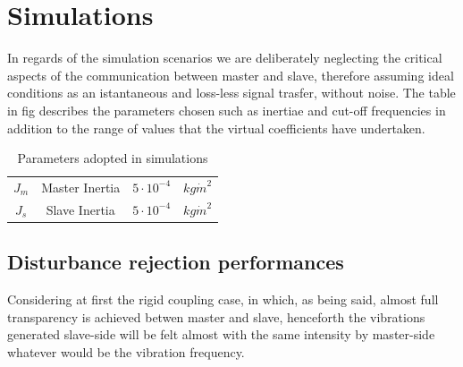 \section{Simulations}
In regards of the simulation scenarios we are deliberately neglecting the
critical aspects of the communication between master and slave, therefore
assuming ideal conditions as an istantaneous and loss-less signal trasfer,
without noise.
The table in fig describes the parameters chosen such as inertiae and
cut-off frequencies in addition to the range of values that the virtual
coefficients have undertaken.
\begin{table}[H]
\centering
	\begin{tabular}{c c c c}
		\toprule
		$J_{m}$  & Master Inertia & $5\cdot 10^{-4}$ & $kg\dot m^{2}$ \\
		$J_{s}$  & Slave Inertia & $5\cdot 10^{-4}$ & $kg\dot m^{2}$ \\
		\bottomrule
	\end{tabular}
	\caption{Parameters adopted in simulations}
	\label{simParams}
\end{table}

\newpage

\subsection{Disturbance rejection performances}

Considering at first the rigid coupling case, in which, as being said, almost
full transparency is achieved betwen master and slave, henceforth the vibrations
generated slave-side will be felt almost with the same intensity by master-side whatever would
be the vibration frequency.


